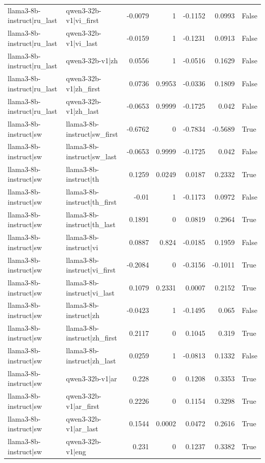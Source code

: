 \begin{table}
\begin{tabular}{l l r r r r l}
llama3-8b-instruct|ru_last & qwen3-32b-v1|vi_first & -0.0079 & 1 & -0.1152 & 0.0993 & False \\
llama3-8b-instruct|ru_last & qwen3-32b-v1|vi_last & -0.0159 & 1 & -0.1231 & 0.0913 & False \\
llama3-8b-instruct|ru_last & qwen3-32b-v1|zh & 0.0556 & 1 & -0.0516 & 0.1629 & False \\
llama3-8b-instruct|ru_last & qwen3-32b-v1|zh_first & 0.0736 & 0.9953 & -0.0336 & 0.1809 & False \\
llama3-8b-instruct|ru_last & qwen3-32b-v1|zh_last & -0.0653 & 0.9999 & -0.1725 & 0.042 & False \\
llama3-8b-instruct|sw & llama3-8b-instruct|sw_first & -0.6762 & 0 & -0.7834 & -0.5689 & True \\
llama3-8b-instruct|sw & llama3-8b-instruct|sw_last & -0.0653 & 0.9999 & -0.1725 & 0.042 & False \\
llama3-8b-instruct|sw & llama3-8b-instruct|th & 0.1259 & 0.0249 & 0.0187 & 0.2332 & True \\
llama3-8b-instruct|sw & llama3-8b-instruct|th_first & -0.01 & 1 & -0.1173 & 0.0972 & False \\
llama3-8b-instruct|sw & llama3-8b-instruct|th_last & 0.1891 & 0 & 0.0819 & 0.2964 & True \\
llama3-8b-instruct|sw & llama3-8b-instruct|vi & 0.0887 & 0.824 & -0.0185 & 0.1959 & False \\
llama3-8b-instruct|sw & llama3-8b-instruct|vi_first & -0.2084 & 0 & -0.3156 & -0.1011 & True \\
llama3-8b-instruct|sw & llama3-8b-instruct|vi_last & 0.1079 & 0.2331 & 0.0007 & 0.2152 & True \\
llama3-8b-instruct|sw & llama3-8b-instruct|zh & -0.0423 & 1 & -0.1495 & 0.065 & False \\
llama3-8b-instruct|sw & llama3-8b-instruct|zh_first & 0.2117 & 0 & 0.1045 & 0.319 & True \\
llama3-8b-instruct|sw & llama3-8b-instruct|zh_last & 0.0259 & 1 & -0.0813 & 0.1332 & False \\
llama3-8b-instruct|sw & qwen3-32b-v1|ar & 0.228 & 0 & 0.1208 & 0.3353 & True \\
llama3-8b-instruct|sw & qwen3-32b-v1|ar_first & 0.2226 & 0 & 0.1154 & 0.3298 & True \\
llama3-8b-instruct|sw & qwen3-32b-v1|ar_last & 0.1544 & 0.0002 & 0.0472 & 0.2616 & True \\
llama3-8b-instruct|sw & qwen3-32b-v1|eng & 0.231 & 0 & 0.1237 & 0.3382 & True \\

\end{tabular}
\end{table}
